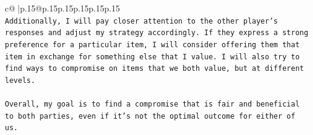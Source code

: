 \documentclass{article}
\begin{document}
{\begin{supertabular}{c@{$\;$}|p{.15\linewidth}@{}p{.15\linewidth}p{.15\linewidth}p{.15\linewidth}p{.15\linewidth}p{.15\linewidth}}
{{{\\ 
\texttt{Additionally, I will pay closer attention to the other player's responses and adjust my strategy accordingly. If they express a strong preference for a particular item, I will consider offering them that item in exchange for something else that I value. I will also try to find ways to compromise on items that we both value, but at different levels.} \\
\\ 
\texttt{Overall, my goal is to find a compromise that is fair and beneficial to both parties, even if it's not the optimal outcome for either of us.} \\
            }
        }
    }
     \\ \\

\end{supertabular}
}
\end{document}
